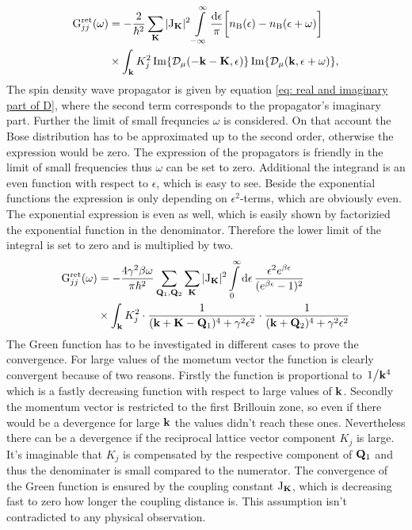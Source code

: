 %
\begin{align}
	\mathrm{G}_{jj}^{\mathrm{ret}}(\omega) &= 
		-\frac{2}{\hbar^{2}} 
		\sum\limits_{\vb{K}} 
		\vert \mathrm{J}_{\vb{K}} \vert^{2}
		\int\limits_{-\infty}^{\infty} \frac{\dd{\epsilon}}{\pi} 
		\bigg[ n_{\mathrm{B}}(\epsilon) - n_{\mathrm{B}}(\epsilon + \omega)\bigg]
		\notag \\
		&\times
		\int_{\vb{k}} K_{j}^{2}
		\Im{\mathcal{D}_{\mu}(-\vb{k}-\vb{K},\epsilon)} 
		\Im{\mathcal{D}_{\mu}(\vb{k}, \epsilon + \omega)},
		\label{eq: Green function on the real axis}
\end{align}
%
The spin density wave propagator is given by equation \eqref{eq: real and imaginary part of D}, where the second term corresponds to the propagator's imaginary part.
Further the limit of small frequncies $\omega$ is considered.
On that account the Bose distribution has to be approximated up to the second order, otherwise the expression would be zero.
The expression of the propagators is friendly in the limit of small frequencies thus $\omega$ can be set to zero.
Additional the integrand is an even function with respect to $\epsilon$, which is easy to see.
Beside the exponential functions the expression is only depending on $\epsilon^{2}$-terms, which are obviously even.
The exponential expression is even as well, which is easily shown by factorizied the exponential function in the denominator.
Therefore the lower limit of the integral is set to zero and is multiplied by two.
%
\begin{align}
	\mathrm{G}_{jj}^{\mathrm{ret}}(\omega) &= 
		-\frac{4 \gamma^{2} \beta \omega}{\pi \hbar^{2}}
		\sum\limits_{\vb{Q}_{1}, \vb{Q}_{2}}
		\sum\limits_{\vb{K}}
		\vert \mathrm{J}_{\vb{K}} \vert^{2}
		\int\limits_{0}^{\infty} \dd{\epsilon}
		\frac{\epsilon^{2} e^{\beta \epsilon}}{(e^{\beta \epsilon} - 1)^{2}}
		\notag \\
		&\times
		\int_{\vb{k}} K_{j}^{2} \cdot
		\frac{1}{(\vb{k}+\vb{K}-\vb{Q}_{1})^{4} + \gamma^{2} \epsilon^{2}} \cdot
		\frac{1}{(\vb{k} + \vb{Q}_{2})^{4} + \gamma^{2} \epsilon^{2}}
\end{align}
%
The Green function has to be investigated in different cases to prove the convergence.
For large values of the mometum vector the function is clearly convergent because of two reasons.
Firstly the function is proportional to $\flatfrac{1}{\vb{k}^{4}}$ which is a fastly decreasing function with respect to large values of $\vb{k}$.
Secondly the momentum vector is restricted to the first Brillouin zone, so even if there would be a devergence for large $\vb{k}$ the values didn't reach these ones.
Nevertheless there can be a devergence if the reciprocal lattice vector component $K_{j}$ is large.
It's imaginable that $K_{j}$ is compensated by the respective component of $\vb{Q}_{1}$ and thus the denominater is small compared to the numerator.
The convergence of the Green function is ensured by the coupling constant $\mathrm{J}_{\vb{K}}$, which is decreasing fast to zero how longer the coupling distance is.
This assumption isn't contradicted to any physical observation.

